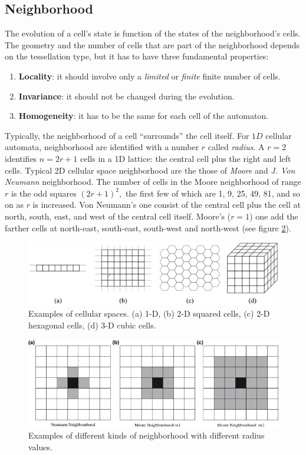 \subsection{Neighborhood}
The evolution of a cell's state is function of the states of the neighborhood's
cells. The geometry and the number of cells that are part of the neighborhood
depends on the tessellation type, but it has to have three fundamental
properties:
\begin{enumerate}
  \item \textbf{Locality}: it should involve only a \textit{limited} or \textit{finite} finite number of cells.
  \item \textbf{Invariance}: it should not be changed during the evolution.
  \item \textbf{Homogeneity}: it has to be the same for each cell of the
  automaton.
\end{enumerate}
Typically, the neighborhood of a cell ``surrounds'' the cell itself. For $1D$ cellular automata, neighborhood are identified with a number $r$ called
\textit{radius}\cite{wolfram1983}. A $r=2$ identifies
$n=2r+1$ cells in a 1D lattice: the central cell plus the
right and left cells. Typical 2D cellular space neighborhood are the those of
\textit{Moore} and \textit{J. Von Neumann} neighborhood. The number of cells in the Moore neighborhood of range $r$ is the odd squares $(2r+1)^2,$ the
first few of which are 1, 9, 25, 49, 81, and so on as $r$ is increased.
Von Neumann's one consist of the central cell plus the cell at north, south,
east, and west of the central cell itself. Moore's ($r=1$)
one add  the farther cells at north-east, south-east, south-west and north-west
(see figure \ref{mooreNeigh}).


\begin{figure}
	\centering
	\caption{Examples of cellular spaces. (a) 1-D, (b) 2-D squared cells,
		(c) 2-D hexagonal cells, (d) 3-D cubic cells.}\label{spazioCellulare}
	\includegraphics[scale=0.23]{./images/CA_FDM/spazioCellulare}
\end{figure}

\begin{figure}
\centering
\caption{Examples of different kinds of neighborhood with
different radius values.}\label{mooreNeigh}
\includegraphics[width=1.0\textwidth]{./images/CA_FDM/mooreNeigh}
\end{figure}

